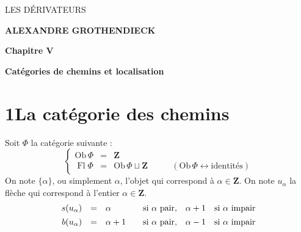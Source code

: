 \documentclass[11pt]{article}
\newcommand{\printedpage}[1]{\marginpar{\footnotesize p.~#1}}
\newcommand{\msp}[1]{\marginpar{\footnotesize [#1]}}
\newcommand{\Ob}{\mathrm{Ob}\,}
\newcommand{\Fl}{\operatorname{Fl}}
\begin{document}
\clearpage

\printedpage{}

\begin{center}
\vspace*{6cm}

{\LARGE\textsf{LES DÉRIVATEURS}}

\vspace{1.5cm}

{\large\textbf{ALEXANDRE GROTHENDIECK}}

\vspace{2.5cm}

{\large\textbf{Chapitre V}}

\vspace{0.4cm}

{\large\textbf{Catégories de chemins et localisation}}
\end{center}

\clearpage

\printedpage{}

\vspace*{6cm}


\clearpage

\printedpage{1}

\msp{page 1}

\section*{1\quad La catégorie des chemins}

Soit $\Phi$ la catégorie suivante :
\[
\left\{
\begin{array}{rcll}
\Ob\Phi & = & \mathbf{Z} & \\
\Fl\Phi & = & \Ob\Phi\sqcup\mathbf{Z} & \qquad (\Ob\Phi\leftrightarrow\text{identités})
\end{array}
\right.
\]
On note $\{\alpha\}$, ou simplement $\alpha$, l'objet qui correspond à $\alpha\in\mathbf{Z}$. On note $u_\alpha$ la flèche qui correspond à l'entier $\alpha\in\mathbf{Z}$.
\[
\begin{array}{rcl@{\qquad}l@{\quad}l@{\quad}l}
s(u_\alpha) & = & \alpha & \text{si } \alpha \text{ pair}, & \alpha+1 & \text{si } \alpha \text{ impair}\\[1ex]
b(u_\alpha) & = & \alpha+1 & \text{si } \alpha \text{ pair}, & \alpha-1 & \text{si } \alpha \text{ impair}
\end{array}
\]
\end{document}
